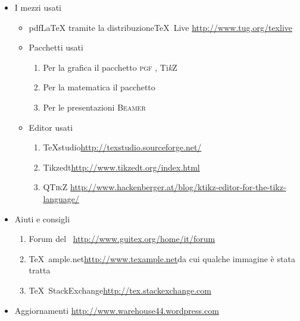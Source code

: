 	\begin{itemize}
		\item I mezzi usati
		\begin{itemize}
			\item pdf\LaTeX{} tramite la distribuzione\TeX{}~Live\newline
			\url{http://www.tug.org/texlive}
			\item Pacchetti usati
			\begin{enumerate}
				\item Per la grafica  il pacchetto \textsc{pgf} \pgfversion, Ti\emph{k}Z
				\item Per la matematica il pacchetto \AmS
				\item Per le presentazioni \textsc{Beamer}
			\end{enumerate}
			\item Editor usati
			\begin{enumerate}
				\item \TeX{}studio\newline \url{http://texstudio.sourceforge.net/} %
				\item Tikzedt\newline \url{http://www.tikzedt.org/index.html} %
				\item \textsc{QTikZ}\newline
				\url{http://www.hackenberger.at/blog/ktikz-editor-for-the-tikz-language/}
			\end{enumerate}
		\end{itemize}
		\item Aiuti e consigli
		\begin{enumerate}
			\item Forum del \guit\ \GuITtext\newline \url{http://www.guitex.org/home/it/forum}
			\item \TeX{}~ample.net\newline \url{http://www.texample.net}\newline da cui qualche immagine è stata tratta
			\item \TeX{}~StackExchange\newline \url{http://tex.stackexchange.com}
		\end{enumerate}
		\item Aggiornamenti
	    \url{http://www.warehouse44.wordpress.com}
	\end{itemize}
	\clearpage
